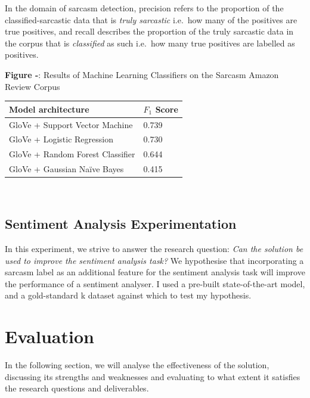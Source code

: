 \documentclass[12pt,a4paper]{article}
\begin{document}
\noindent In the domain of sarcasm detection, precision refers to the proportion of the classified-sarcastic data that is \textit{truly sarcastic} i.e.\ how many of the positives are true positives, and recall describes the proportion of the truly sarcastic data in the corpus that is \textit{classified} as such i.e.\ how many true positives are labelled as positives. \\


\begin{center}
	\textbf{Figure -}: Results of Machine Learning Classifiers on the Sarcasm Amazon Review Corpus
\end{center}
\begin{center}
	\begin{tabular}{p{8cm}p{2cm}}
		\hline
		\textbf{Model architecture} & \textbf{$F_{1}$ Score}\\
		\hline\hline
		GloVe + Support Vector Machine & 0.739\\
		\hline
		GloVe + Logistic Regression & 0.730\\
		\hline
		GloVe + Random Forest Classifier & 0.644\\
		\hline
		GloVe + Gaussian Na\"{i}ve Bayes & 0.415\\
		\hline
	\end{tabular}\\
\end{center}

\subsection{Sentiment Analysis Experimentation}
In this experiment, we strive to answer the research question: \textit{Can the solution be used to improve the sentiment analysis task?} We hypothesise that incorporating a sarcasm label as an additional feature for the sentiment analysis task will improve the performance of a sentiment analyser. I used a pre-built state-of-the-art model, and a gold-standard k dataset against which to test my hypothesis.



\section{Evaluation}
In the following section, we will analyse the effectiveness of the solution, discussing its strengths and weaknesses and evaluating to what extent it satisfies the research questions and deliverables.
\end{document}
